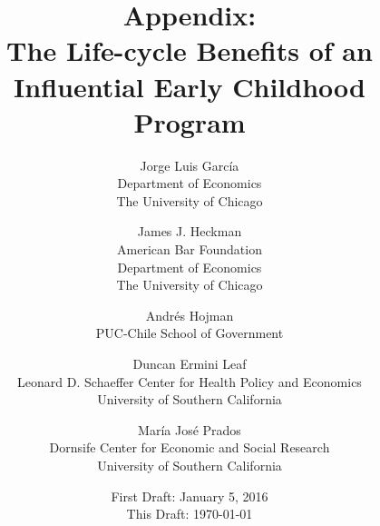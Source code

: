 



\renewcommand\theassumption{AA--\arabic{assumption}}


\title{\Large \textbf{Appendix: \\ The Life-cycle Benefits of an Influential Early Childhood Program}}

\author{
Jorge Luis Garc\'{i}a\\
Department of Economics\\
The University of Chicago \and
James J. Heckman \\
American Bar Foundation \\
Department of Economics\\
The University of Chicago \and
Andr\'{e}s Hojman \\
PUC-Chile School of Government \\ \and
Duncan Ermini Leaf \\
Leonard D. Schaeffer Center for Health Policy and Economics\\
University of Southern California \and
Mar\'{i}a Jos\'{e} Prados \\
Dornsife Center for Economic and Social Research\\
University of Southern California}
\date{First Draft: January 5, 2016\\ This Draft: \today}
\maketitle
\thispagestyle{empty}


\tableofcontents
\listoffigures
\listoftables
\doublespacing

